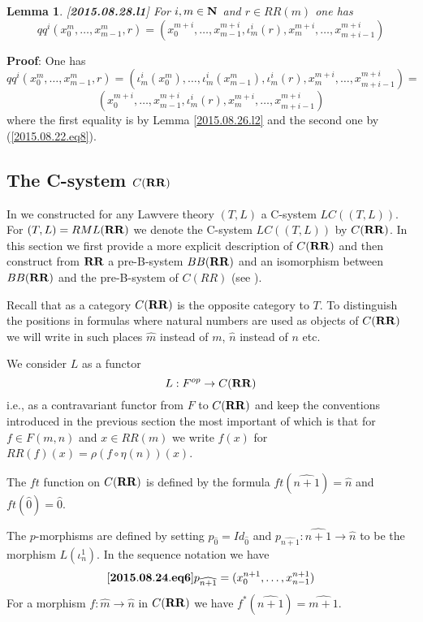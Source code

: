 \documentclass[11pt]{article}
\newenvironment{eq}{\begin{equation}}{\end{equation}}
\newenvironment{proof}{{\bf Proof}:}{\vskip 5mm }
\newtheorem{lemma}[proposition]{Lemma}
\newcommand{\llabel}[1]{\label{#1}[{\bf #1}]}
\newcommand{\sr}{\rightarrow}
\newcommand{\nn}{{\bf N\rm}}
\newcommand{\nat}{\nn}
\newcommand{\wh}{\widehat}
\newcommand{\mbind}{\rho}
\newcommand{\RR}{{\bf RR}}
\begin{document}
%
\begin{lemma}
\llabel{2015.08.28.l1}
For $i,m\in\nat$ and $r\in RR(m)$ one has
%
$$qq^i(x_0^m,\dots,x^m_{m-1},r)=(x_0^{m+i},\dots,x^{m+i}_{m-1},\iota_m^i(r),x_m^{m+i},\dots,x_{m+i-1}^{m+i})$$
%
\end{lemma}
%
\begin{proof}
One has
%
$$qq^i(x_0^m,\dots,x^m_{m-1},r)=(\iota_m^i(x_0^m),\dots,\iota_m^i(x^m_{m-1}),\iota_m^i(r),x_m^{m+i},\dots,x_{m+i-1}^{m+i})=$$
$$(x_0^{m+i},\dots,x^{m+i}_{m-1},\iota_m^i(r),x_m^{m+i},\dots,x_{m+i-1}^{m+i})$$
%
where the first equality is by Lemma \ref{2015.08.26.l2} and the second one by (\ref{2015.08.22.eq8}). 
\end{proof}
%






\subsection{The C-system $C(\RR)$}
%

In \cite{LandC} we constructed for any Lawvere theory $(T,L)$ a C-system $LC((T,L))$. For $(T,L)=RML(\RR)$ we denote the C-system $LC((T,L))$ by $C(\RR)$. In this section we first provide a more explicit description of $C(\RR)$ and then construct from $\RR$ a pre-B-system $BB(\RR)$ and an isomorphism between $BB(\RR)$ and the pre-B-system of $C(RR)$ (see \cite{Bsystems}).   

Recall that as a category $C(\RR)$ is the opposite category to $T$.  To distinguish the positions in formulas where natural numbers are used as objects of $C(\RR)$ we will write in such places $\wh{m}$ instead of $m$, $\wh{n}$ instead of $n$ etc.  

We consider $L$ as a functor
%
$${L}:F^{op}\sr C(\RR)$$
%
i.e., as a contravariant functor from $F$ to $C(\RR)$ and keep the conventions introduced in the previous section the most important of which is that for $f\in F(m,n)$ and $x\in RR(m)$ we write $f(x)$ for $RR(f)(x)=\mbind(f\circ \eta(n))(x)$. 

The $ft$ function on $C(\RR)$ is defined by the formula $ft(\wh{n+1})=\wh{n}$ and $ft(\wh{0})=\wh{0}$.

The $p$-morphisms are defined by setting $p_{\wh{0}}=Id_{\wh{0}}$ and $p_{\wh{n+1}}:\wh{n+1}\sr \wh{n}$ to be the morphism $L(\iota_n^1)$. In the sequence notation we have
%
\begin{eq}\llabel{2015.08.24.eq6}
p_{\wh{n+1}}=(x_0^{n+1},\dots,x_{n-1}^{n+1})
\end{eq}
%
For a morphism $f:\wh{m}\sr \wh{n}$ in $C(\RR)$ we have $f^*(\wh{n+1})=\wh{m+1}$. 
\end{document}
